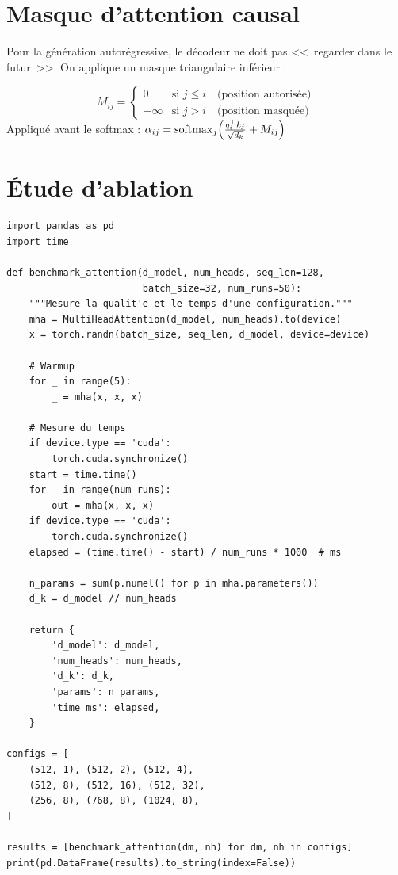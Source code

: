 \section{Masque d'attention causal}
\label{sec:causal-mask}

Pour la g\'en\'eration autor\'egressive, le d\'ecodeur ne doit pas
<<~regarder dans le futur~>>. On applique un masque triangulaire inf\'erieur :

\begin{formules}[title=\textbf{Masque causal}]
\begin{equation}
M_{ij} = \begin{cases}
0 & \text{si } j \leq i \quad \text{(position autoris\'ee)} \\
-\infty & \text{si } j > i \quad \text{(position masqu\'ee)}
\end{cases}
\end{equation}
Appliqu\'e avant le softmax :
$\alpha_{ij} = \mathrm{softmax}_j\!\left(\frac{q_i^\top k_j}{\sqrt{d_k}} + M_{ij}\right)$
\end{formules}

\section{\'Etude d'ablation}
\label{sec:attention-ablation}

\begin{codeblock}[title=\textbf{Ablation : nombre de t\^etes et dimension par t\^ete}]
\begin{verbatim}
import pandas as pd
import time

def benchmark_attention(d_model, num_heads, seq_len=128,
                        batch_size=32, num_runs=50):
    """Mesure la qualit'e et le temps d'une configuration."""
    mha = MultiHeadAttention(d_model, num_heads).to(device)
    x = torch.randn(batch_size, seq_len, d_model, device=device)

    # Warmup
    for _ in range(5):
        _ = mha(x, x, x)

    # Mesure du temps
    if device.type == 'cuda':
        torch.cuda.synchronize()
    start = time.time()
    for _ in range(num_runs):
        out = mha(x, x, x)
    if device.type == 'cuda':
        torch.cuda.synchronize()
    elapsed = (time.time() - start) / num_runs * 1000  # ms

    n_params = sum(p.numel() for p in mha.parameters())
    d_k = d_model // num_heads

    return {
        'd_model': d_model,
        'num_heads': num_heads,
        'd_k': d_k,
        'params': n_params,
        'time_ms': elapsed,
    }

configs = [
    (512, 1), (512, 2), (512, 4),
    (512, 8), (512, 16), (512, 32),
    (256, 8), (768, 8), (1024, 8),
]

results = [benchmark_attention(dm, nh) for dm, nh in configs]
print(pd.DataFrame(results).to_string(index=False))
\end{verbatim}
\end{codeblock}


